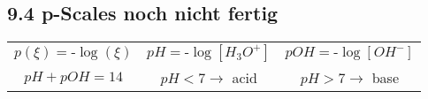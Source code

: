 \subsection{9.4 p-Scales \textbf{noch nicht fertig}}
    \begin{center}
        \begin{tabular}{c c c}
            $p(\xi) = \mbox{-}\log(\xi)$ & $pH = \mbox{-}\log[H_3O^+]$ & $pOH = \mbox{-}\log[OH^-]$\\
            $pH + pOH = 14$ & $pH < 7 \rightarrow$ acid & $pH > 7 \rightarrow$ base
        \end{tabular}
    \end{center}